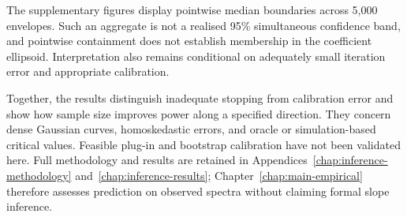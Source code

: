 The supplementary figures display pointwise median boundaries across
5,000 envelopes.  Such an aggregate is not a realised 95\% simultaneous
confidence band, and pointwise containment does not establish membership
in the coefficient ellipsoid.  Interpretation also remains conditional on
adequately small iteration error and appropriate calibration.

Together, the results distinguish inadequate stopping from calibration
error and show how sample size improves power along a specified direction.
They concern dense Gaussian curves, homoskedastic errors, and oracle or
simulation-based critical values.  Feasible plug-in and bootstrap
calibration have not been validated here.  Full methodology and results
are retained in Appendices~\ref{chap:inference-methodology}
and~\ref{chap:inference-results}; Chapter~\ref{chap:main-empirical}
therefore assesses prediction on observed spectra without claiming formal
slope inference.
